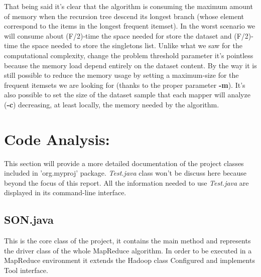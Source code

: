 \documentclass[]{report}
\begin{document}
	That being said it's clear that the algorithm is consuming the maximum amount of memory when the recursion tree descend its longest branch (whose element correspond to the items in the longest frequent itemset). In the worst scenario we will consume about (F/2)-time the space needed for store the dataset and (F/2)-time the space needed to store the singletons list. Unlike what we saw for the computational complexity, change the problem threshold parameter it's pointless because the memory load depend entirely on the dataset content. By the way it is still possible to reduce the memory usage by setting a maximum-size for the frequent itemsets we are looking for (thanks to the proper parameter \textbf{-m}). It's also possible to set the size of the dataset sample that each mapper will analyze (\textbf{-c}) decreasing, at least locally, the memory needed by the algorithm.          

\section*{Code Analysis:}

	This section will provide a more detailed documentation of the project classes included in 'org.myproj' package. \textit{Test.java} class won't be discuss here because beyond the focus of this report. All the information needed to use \textit{Test.java} are displayed in its command-line interface.  
	
	\subsection*{SON.java}
	This is the core class of the project, it contains the main method and represents the driver class of the whole MapReduce algorithm. In order to be executed in a MapReduce environment it extends the Hadoop class Configured and implements Tool interface.
	
\end{document}
